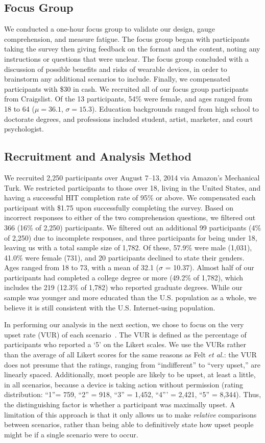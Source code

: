 \documentclass[conference]{IEEEtran}
\begin{document}
\subsection{Focus Group}
We conducted a one-hour focus group to validate our design, gauge comprehension, and measure fatigue. The focus group began with participants taking the survey then giving feedback on the format and the content, noting any instructions or questions that were unclear. The focus group concluded with a discussion of possible benefits and risks of wearable devices, in order to brainstorm any additional scenarios to include. Finally, we compensated participants with \$30 in cash. We recruited all of our focus group participants from Craigslist. Of the 13 participants, 54\% were female, and ages ranged from 18 to 64 ($\mu = 36.1$, $\sigma = 15.3$).  Education backgrounds ranged from high school to doctorate degrees, and professions included student, artist, marketer, and court psychologist.

\subsection{Recruitment and Analysis Method}
We recruited 2,250 participants over August 7--13, 2014 via Amazon's Mechanical Turk. We restricted participants to those over 18, living in the United States, and having a successful HIT completion rate of 95\% or above. We compensated each participant with \$1.75 upon successfully completing the survey. Based on incorrect responses to either of the two comprehension questions, we filtered out 366 (16\% of 2,250) participants. We filtered out an additional 99 participants (4\% of 2,250) due to incomplete responses, and three participants for being under 18, leaving us with a total sample size of 1,782. Of these, 57.9\% were male (1,031), 41.0\% were female (731), and 20 participants declined to state their genders. Ages ranged from 18 to 73, with a mean of 32.1 ($\sigma$ = 10.37). Almost half of our participants had completed a college degree or more (49.2\% of 1,782), which includes the 219 (12.3\% of 1,782) who reported graduate degrees. While our sample was younger and more educated than the U.S. population as a whole, we believe it is still consistent with the U.S. Internet-using population.

In performing our analysis in the next section, we chose to focus on the very upset rate (VUR) of each scenario~\cite{Felt}.  The VUR is defined as the percentage of participants who reported a `5' on the Likert scales. 
We use the VURs rather than the average of all Likert scores for the same reasons as Felt {\it et al.}: the VUR does not presume that the ratings, ranging from ``indifferent'' to ``very upset,'' are linearly spaced. Additionally, most people are likely to be upset, at least a little, in all scenarios, because a device is taking action without permission (rating distribution: ``1''= 759, ``2'' = 918, ``3'' = 1,452, ``4''' = 2,421, ``5'' = 8,344). Thus, the distinguishing factor is whether a participant was maximally upset. A limitation of this approach is that it only allows us to make {\it relative} comparisons between scenarios, rather than being able to definitively state how upset people might be if a single scenario were to occur.
\end{document}
